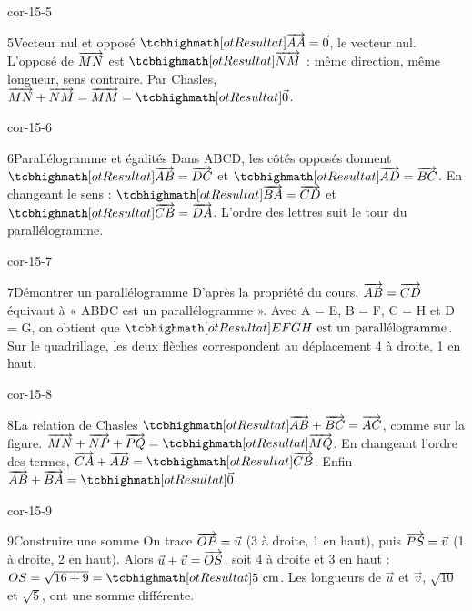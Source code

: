 \begin{blocLivre}{cor-15-5}\begin{corrige}{5}{Vecteur nul et opposé}
$\res{\vect{AA}=\vec0}$, le vecteur nul. L’opposé de $\overrightarrow{MN}$ est $\res{\vect{NM}}$ : même direction, même longueur, sens contraire. Par Chasles, $\vect{MN}+\vect{NM}=\vect{MM}=\res{\vec0}$.
\label{fig-cor-15-5}
\end{corrige}\end{blocLivre}
\begin{blocLivre}{cor-15-6}\begin{corrige}{6}{Parallélogramme et égalités}
Dans ABCD, les côtés opposés donnent $\res{\vect{AB}=\vect{DC}}$ et $\res{\vect{AD}=\vect{BC}}$. En changeant le sens : $\res{\vect{BA}=\vect{CD}}$ et $\res{\vect{CB}=\vect{DA}}$. L’ordre des lettres suit le tour du parallélogramme.
\label{fig-cor-15-6}
\end{corrige}\end{blocLivre}
\begin{blocLivre}{cor-15-7}\begin{corrige}{7}{Démontrer un parallélogramme}
D’après la propriété du cours, $\overrightarrow{AB}=\overrightarrow{CD}$ équivaut à « ABDC est un parallélogramme ». Avec A = E, B = F, C = H et D = G, on obtient que $\res{EFGH\text{ est un parallélogramme}}$. Sur le quadrillage, les deux flèches correspondent au déplacement 4 à droite, 1 en haut.
\label{fig-cor-15-7}
\end{corrige}\end{blocLivre}
\begin{blocLivre}{cor-15-8}\begin{corrige}{8}{La relation de Chasles}
$\res{\vect{AB}+\vect{BC}=\vect{AC}}$, comme sur la figure. $\vect{MN}+\vect{NP}+\vect{PQ}=\res{\vect{MQ}}$. En changeant l’ordre des termes, $\vect{CA}+\vect{AB}=\res{\vect{CB}}$. Enfin $\vect{AB}+\vect{BA}=\res{\vec0}$.
\label{fig-cor-15-8}
\end{corrige}\end{blocLivre}
\begin{blocLivre}{cor-15-9}\begin{corrige}{9}{Construire une somme}
On trace $\overrightarrow{OP}=\vec u$ (3 à droite, 1 en haut), puis $\overrightarrow{PS}=\vec v$ (1 à droite, 2 en haut). Alors $\vec u+\vec v=\overrightarrow{OS}$, soit 4 à droite et 3 en haut : $OS=\sqrt{16+9}=\res{5\text{ cm}}$. Les longueurs de $\vec u$ et $\vec v$, $\sqrt{10}$ et $\sqrt5$, ont une somme différente.
\label{fig-cor-15-9}
\end{corrige}\end{blocLivre}
